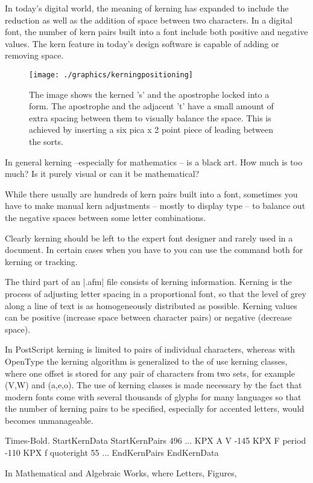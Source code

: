 \begin{multicols}{2}
In today's digital world, the meaning of kerning has expanded to include the reduction as well as the addition of space between two characters. In a digital font, the number of kern pairs built into a font include both positive and negative values. The kern feature in today's design software is capable of adding or removing space. 


\begin{figure}[htbp]
\centering
\texttt{[image: ./graphics/kerningpositioning]}
\caption{The image shows the kerned 's' and the apostrophe locked into a form. The apostrophe and the adjacent 't' have a small amount of extra spacing between them to visually balance the space. This is achieved by inserting a six pica x 2 point piece of leading between the sorts.}
\end{figure}

In general kerning --especially for mathematics -- is a black art. How much is too much? Is it purely visual or can it be mathematical?

While there usually are hundreds of kern pairs built into a font, sometimes you have to make manual kern adjustments -- mostly to display type -- to balance out the negative spaces between some letter combinations.

Clearly kerning should be left to the expert font designer and rarely used in a document. In certain cases when you have to you can use the command  both for kerning or tracking. 


The third part of an |.afm| file consists of kerning information. Kerning is the process of adjusting
letter spacing in a proportional font, so that the level of grey along a line of text is as homogeneously
distributed as possible. Kerning values can be positive (increase space between character pairs) or negative
(decrease space).

In PostScript kerning is limited to pairs of individual characters, whereas with OpenType the kerning
algorithm is generalized to the of use kerning classes, where one offset is stored for any pair of characters
from two sets, for example (V,W) and (a,e,o). The use of kerning classes is made necessary by the
fact that modern fonts come with several thousands of glyphs for many languages so that the
number of kerning pairs to be specified, especially for accented letters, would becomes unmanageable.


\begin{teXXX}
Times-Bold.
StartKernData
StartKernPairs 496
...
KPX A V -145
KPX F period -110
KPX f quoteright 55
...
EndKernPairs
EndKernData
\end{teXXX}

In Mathematical and Algebraic Works, where Letters, Figures, 
\end{multicols}


